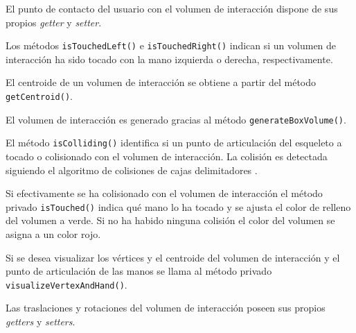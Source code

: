 \documentclass[10pt,a4paper]{report}
\begin{document}
	El punto de contacto del usuario con el volumen de interacción dispone de sus propios \textit{getter} y \textit{setter}.
	
	
	
	Los métodos \texttt{isTouchedLeft()} e \texttt{isTouchedRight()} indican si un volumen de interacción ha sido tocado con la mano izquierda o derecha, respectivamente.
	
	
	
	El centroide de un volumen de interacción se obtiene a partir del método \texttt{getCentroid()}.
	
	
	
	El volumen de interacción es generado gracias al método \texttt{generateBoxVolume()}.
	
	
	
	El método \texttt{isColliding()} identifica si un punto de articulación del esqueleto a tocado o colisionado con el volumen de interacción. La colisión es detectada siguiendo el algoritmo de colisiones de cajas delimitadores \cite{3d-collision-detection}.
	
	
	
	Si efectivamente se ha colisionado con el volumen de interacción el método privado \texttt{isTouched()} indica qué mano lo ha tocado y se ajusta el color de relleno del volumen a verde. Si no ha habido ninguna colisión el color del volumen se asigna a un color rojo.
	
	
	
	Si se desea visualizar los vértices y el centroide del volumen de interacción y el punto de articulación de las manos se llama al método privado \texttt{visualizeVertexAndHand()}.
	
	
	
	Las traslaciones y rotaciones del volumen de interacción poseen sus propios \textit{getters} y \textit{setters}.
	
\end{document}
